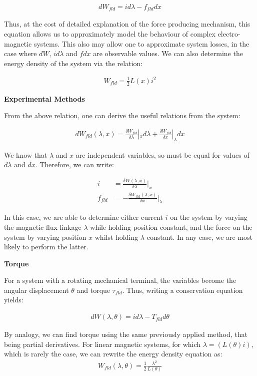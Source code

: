 \documentclass{book}
\begin{document}
\begin{align*}
	dW_{fld} = i d\lambda - f_{fld} dx 
\end{align*}

Thus, at the cost of detailed explanation of the force producing mechanism, this equation allows us to approximately model the behaviour of complex electro-magnetic systems. This also may allow one to approximate system losses, in the case where $dW$, $id\lambda$ and $fdx$ are observable values.  We can also determine the energy density of the system via the relation:

\begin{align*}
	W_{fld} = \frac{1}{2} L(x)i^2
\end{align*}

\textbf{Experimental Methods}

From the above relation, one can derive the useful relations from the system:

\begin{align*}
	dW_{fld} (\lambda, x) = \frac{\delta W_{fld}}{\delta \lambda}|_{x} d \lambda + \frac{\delta W_{fld}}{\delta x}|_{\lambda} dx
\end{align*}

We know that $\lambda$ and $x$ are independent variables, so  must be equal for values of $d\lambda$ and $dx$. Therefore, we can write:

\begin{align*}
	i &= \frac{\delta W(\lambda, x)}{\delta \lambda}|_x \\
	f_{fld} &= -\frac{\delta W_{fld}(\lambda, x)}{\delta x}|_\lambda
\end{align*}

In this case, we are able to determine either current $i$ on the system by varying the magnetic flux linkage $\lambda$ while holding position constant, and the force on the system by varying position $x$ whilst holding $\lambda$ constant. In any case, we are most likely to perform the latter.

\textbf{Torque}

For a system with a rotating mechanical terminal, the variables become the angular displacement $\theta$ and torque $\tau_{fld}$. Thus, writing a conservation equation yields:

\begin{align*}
	dW(\lambda, \theta) = i d\lambda - T_{fld} d\theta
\end{align*}

By analogy, we can find torque using the same previously applied method, that being partial derivatives. For linear magnetic systems, for which $\lambda = (L(\theta) i)$, which is rarely the case, we can rewrite the energy density equation as:
\begin{align*}
	W_{fld} (\lambda, \theta) = \frac{1}{2}\frac{\lambda^2}{L(\theta)}
\end{align*}
\end{document}
